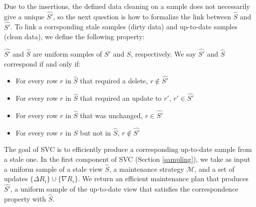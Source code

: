 Due to the insertions, the defined data cleaning on a sample does not necessarily give a unique $\hat{S'}$, so the next question is how to formalize the link between $\hat{S}$ and $\hat{S'}$. 
To link a corrsponding stale samples (dirty data) and up-to-date samples (clean data), we define the following property:
\begin{definition}[Correspondence]
$\hat{S'}$ and $\hat{S}$ are uniform samples of $S'$ and $S$, respectively.  We say $\hat{S'}$ and $\hat{S}$ correspond if and only if:
\begin{itemize}[noitemsep]
\item For every row $r$ in $\hat{S}$ that required a delete, $r \not\in \hat{S'}$
\item For every row $r$ in $\hat{S}$ that required an update to $r'$, $r' \in \hat{S'}$
\item For every row $r$ in $\hat{S}$  that was unchanged, $r \in \hat{S'}$
\item For every row $r$ in $S$ but not in $\hat{S}$, $r \not\in \hat{S'}$
\end{itemize}
\label{correspondence}
\end{definition}

The goal of SVC is to efficiently produce a corresponding up-to-date sample from a stale one.
In the first component of SVC (Section \ref{sampling}), we take as input a uniform sample of a stale view $\hat{S}$, a maintenance strategy $\mathcal{M}$, and a set of updates $\{\Delta R_i\} \cup \{\nabla R_i\}$.
We return an efficient maintenance plan that produces $\hat{S'}$, a uniform sample of the up-to-date view that satisfies the correspondence property with $\hat{S}$.


